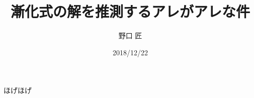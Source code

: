 \documentclass[11pt,a4paper]{ltjsarticle} %
\title{漸化式の解を推測するアレがアレな件}
\author{野口 匠}
\date{2018/12/22}
\theoremstyle{mystyle} %
\begin{document}
%
\maketitle
%
ほげほげ
\end{document}
